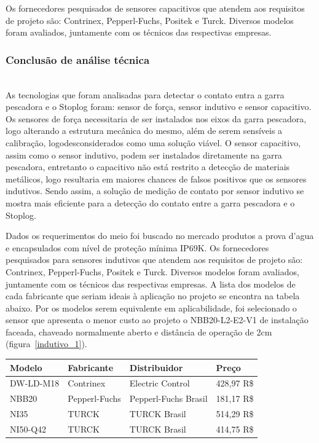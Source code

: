 Os fornecedores pesquisados de sensores capacitivos que atendem aos requisitos de projeto são: Contrinex, Pepperl-Fuchs, Positek e Turck. Diversos modelos foram avaliados, juntamente com os técnicos das respectivas empresas.



 \subsubsection{Conclusão de análise técnica}\mbox{}\\


As tecnologias que foram analisadas para detectar o contato entra a garra pescadora e o Stoplog foram: sensor de força, sensor indutivo e sensor capacitivo. Os sensores de força necessitaria de ser instalados nos eixos da garra pescadora, logo alterando a estrutura mecânica do mesmo, além de serem sensíveis a calibração, logodesconsiderados como uma solução viável. O sensor capacitivo, assim como o sensor indutivo, podem ser instalados diretamente na garra pescadora, entretanto o capacitivo não está restrito a detecção de materiais metálicos, logo resultaria em maiores chances de falsos positivos que os sensores indutivos.  Sendo assim, a solução de medição de contato por sensor indutivo se mostra mais eficiente para a detecção do contato entre a garra pescadora e o Stoplog. 

Dados os requerimentos do meio foi buscado no mercado produtos a prova d’agua e encapsulados com nível de proteção mínima IP69K. Os fornecedores pesquisados para sensores indutivos que atendem aos requisitos de projeto são: Contrinex, Pepperl-Fuchs, Positek e Turck. Diversos modelos foram avaliados, juntamente com os técnicos das respectivas empresas. A lista dos modelos de cada fabricante que seriam ideais à aplicação no projeto se encontra na tabela abaixo. Por os modelos serem equivalente em aplicabilidade, foi selecionado o sensor que apresenta o menor custo ao projeto o NBB20-L2-E2-V1 de instalação faceada, chaveado normalmente aberto e distância de operação de 2cm (figura~\ref{indutivo_1}).


\begin{center}
    \begin{tabular}{| l | l | l | l | }
    \hline
	{\bf Modelo} & 	{\bf Fabricante} &		{\bf Distribuidor}	&	{\bf Preço} \\  \hline
	DW-LD-M18&		Contrinex&			Electric Control&		428,97 R{\$} \\  \hline
	NBB20&			Pepperl-Fuchs&		Pepperl-Fuchs Brasil&	181,17 R{\$} \\  \hline
	NI35&			TURCK&				TURCK Brasil&			514,29 R{\$} \\  \hline
	NI50-Q42&		TURCK&				TURCK Brasil&			414,75 R{\$} \\ \hline
\hline 
\end{tabular}
\end{center}

